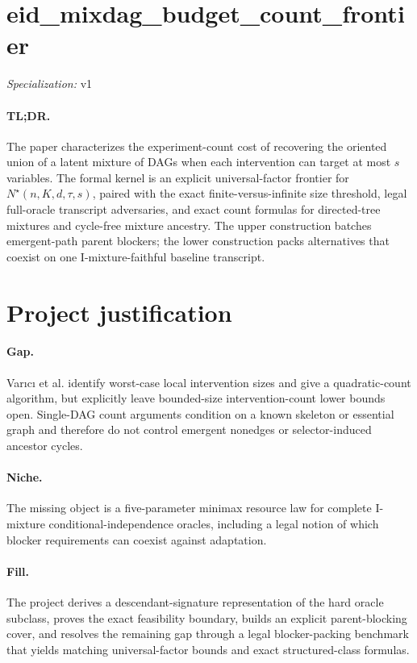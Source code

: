 \documentclass{article}
\begin{document}
\sloppy

\section*{eid\_\allowbreak{}mixdag\_\allowbreak{}budget\_\allowbreak{}count\_\allowbreak{}frontier}

\noindent\textit{Specialization:} v1\par

\paragraph{TL;DR.} The paper characterizes the experiment-count cost of recovering the oriented union of a latent mixture of DAGs when each intervention can target at most \(s\) variables. The formal kernel is an explicit universal-factor frontier for \(N^{\star}(n,K,d,\tau,s)\), paired with the exact finite-versus-infinite size threshold, legal full-oracle transcript adversaries, and exact count formulas for directed-tree mixtures and cycle-free mixture ancestry. The upper construction batches emergent-path parent blockers; the lower construction packs alternatives that coexist on one I-mixture-faithful baseline transcript.

\section{Project justification}

\paragraph{Gap.} Varıcı et al. identify worst-case local intervention sizes and give a quadratic-count algorithm, but explicitly leave bounded-size intervention-count lower bounds open. Single-DAG count arguments condition on a known skeleton or essential graph and therefore do not control emergent nonedges or selector-induced ancestor cycles.

\paragraph{Niche.} The missing object is a five-parameter minimax resource law for complete I-mixture conditional-independence oracles, including a legal notion of which blocker requirements can coexist against adaptation.

\paragraph{Fill.} The project derives a descendant-signature representation of the hard oracle subclass, proves the exact feasibility boundary, builds an explicit parent-blocking cover, and resolves the remaining gap through a legal blocker-packing benchmark that yields matching universal-factor bounds and exact structured-class formulas.
\end{document}
